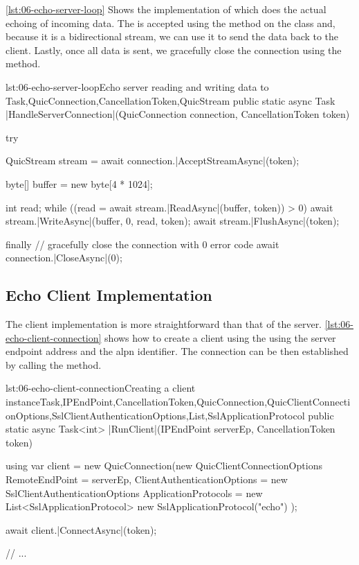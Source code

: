 \autoref{lst:06-echo-server-loop} Shows the implementation of  which
does the actual echoing of incoming data. The \QuicStream{} is accepted using the
 method on the \QuicConnection{} class and, because it is a bidirectional
stream, we can use it to send the data back to the client. Lastly, once all data is sent, we
gracefully close the connection using the  method.

\begin{myListingCsharp}{lst:06-echo-server-loop}{Echo server reading and writing data to \QuicStream{}}{Task,QuicConnection,CancellationToken,QuicStream}{}
public static async Task |HandleServerConnection|(QuicConnection connection,
    CancellationToken token)
{
    try
    {
        QuicStream stream = await connection.|AcceptStreamAsync|(token);

        byte[] buffer = new byte[4 * 1024];

        int read;
        while ((read = await stream.|ReadAsync|(buffer, token)) > 0)
        {
            await stream.|WriteAsync|(buffer, 0, read, token);
            await stream.|FlushAsync|(token);
        }
    }
    finally
    {
        // gracefully close the connection with 0 error code
        await connection.|CloseAsync|(0);
    }
}
\end{myListingCsharp}

\subsection{Echo Client Implementation}

The client implementation is more straightforward than that of the server.
\autoref{lst:06-echo-client-connection} shows how to create a client \QuicConnection{} using the
using the server endpoint address and the \gls{alpn} identifier. The connection can be then
established by calling the  method.

\begin{myListingCsharpNoPageBreak}{lst:06-echo-client-connection}{Creating a client \QuicConnection{} instance}{Task,IPEndPoint,CancellationToken,QuicConnection,QuicClientConnectionOptions,SslClientAuthenticationOptions,List,SslApplicationProtocol}{}
public static async Task<int> |RunClient|(IPEndPoint serverEp,
    CancellationToken token)
{
    using var client = new QuicConnection(new QuicClientConnectionOptions
    {
        RemoteEndPoint = serverEp,
        ClientAuthenticationOptions = new SslClientAuthenticationOptions
        {
            ApplicationProtocols = new List<SslApplicationProtocol>
            {
                new SslApplicationProtocol("echo")
            }
        }
    });

    await client.|ConnectAsync|(token);

    // ...
}
\end{myListingCsharpNoPageBreak}

